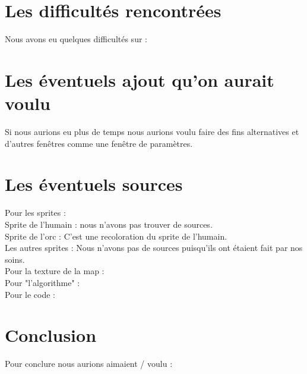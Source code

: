 \documentclass[a4paper, 11pt]{article}
\begin{document}
\section{Les difficultés rencontrées}

Nous avons eu quelques difficultés sur : \\

\newpage

\section{Les éventuels ajout qu'on aurait voulu}

Si nous aurions eu plus de temps nous aurions voulu faire des fins alternatives et d'autres fenêtres comme une fenêtre de paramètres.\\

\newpage

\section{Les éventuels sources}

Pour les sprites : \\
		 Sprite de l'humain : nous n'avons pas trouver de sources.\\
		 Sprite de l'orc : C'est une recoloration du sprite de l'humain.\\
		 Les autres sprites : Nous n'avons pas de sources puisqu'ils ont étaient fait par nos soins.\\
Pour la texture de la map : \\
Pour "l'algorithme" : \\
Pour le code : \\

\newpage

\section{Conclusion}

Pour conclure nous aurions aimaient / voulu :\\

\newpage
\end{document}
